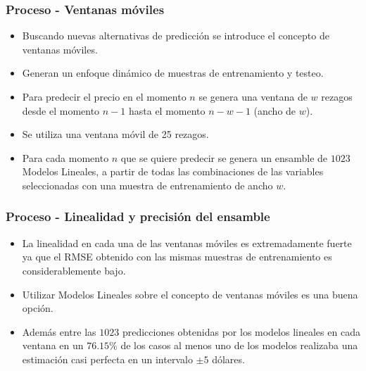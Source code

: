 \documentclass{beamer}
\begin{document}
\begin{frame}[t]
\frametitle{Proceso - Ventanas móviles}

\vfill
\begin{itemize}
\item
Buscando nuevas alternativas de predicción se introduce el concepto de ventanas móviles.
\item 
Generan un enfoque dinámico de muestras de entrenamiento y testeo.
\item 
Para predecir el precio en el momento $n$ se genera una ventana de $w$ rezagos desde el momento $n-1$ hasta el momento $n-w-1$ (ancho de $w$). 
\item
Se utiliza una ventana móvil de 25 rezagos. 
\item
Para cada momento $n$ que se quiere predecir se genera un ensamble de $1023$ Modelos Lineales, a partir de todas las combinaciones de las variables seleccionadas con una muestra de entrenamiento de ancho $w$.

\vfill
\end{itemize}

\end{frame}
\begin{frame}[t]
\frametitle{Proceso - Linealidad y precisión del ensamble}
\vfill
\begin{itemize}
\item 
La linealidad en cada una de las ventanas móviles es extremadamente fuerte ya que el RMSE obtenido con las mismas muestras de entrenamiento es considerablemente bajo.
\item 
Utilizar Modelos Lineales sobre el concepto de ventanas móviles es una buena opción.
\item 
Además entre las $1023$ predicciones obtenidas por los modelos lineales en cada ventana en un  $76.15\%$ de los casos al menos uno de los modelos realizaba una estimación casi perfecta en un intervalo $\pm 5$ dólares. 
\vfill
\end{itemize}
\end{frame}
\end{document}
